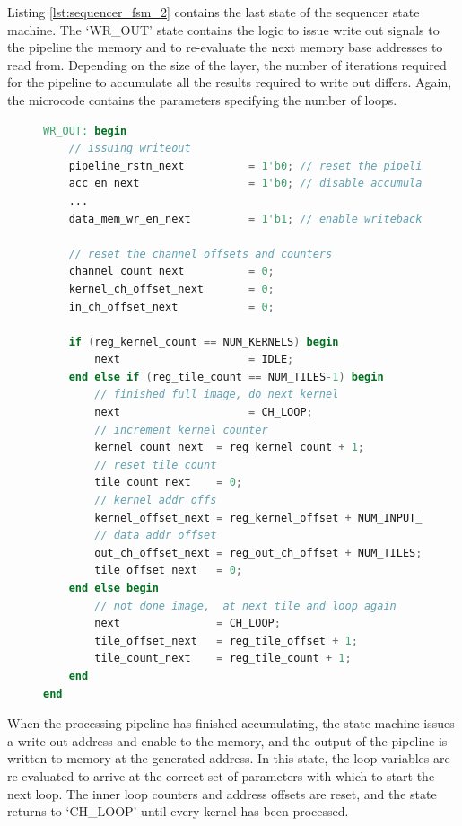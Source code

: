 \documentclass{uw-ece-wkrpt}
\begin{document}
Listing \ref{lst:sequencer_fsm_2} contains the last state of the sequencer state machine. The `WR\_OUT' state contains the logic to issue write out signals to the pipeline the memory and to re-evaluate the next memory base addresses to read from. Depending on the size of the layer, the number of iterations required for the pipeline to accumulate all the results required to write out differs. Again, the microcode contains the parameters specifying the number of loops.

\begin{figure}
\centering
\begin{lstlisting}[caption={Sequencer state machine part 2}, label=lst:sequencer_fsm_2, language=Verilog]
WR_OUT: begin
    // issuing writeout
    pipeline_rstn_next          = 1'b0; // reset the pipeline
    acc_en_next                 = 1'b0; // disable accumulation
    ...
    data_mem_wr_en_next         = 1'b1; // enable writeback memory

    // reset the channel offsets and counters
    channel_count_next          = 0;
    kernel_ch_offset_next       = 0;
    in_ch_offset_next           = 0;

    if (reg_kernel_count == NUM_KERNELS) begin
        next                    = IDLE;
    end else if (reg_tile_count == NUM_TILES-1) begin
        // finished full image, do next kernel
        next                    = CH_LOOP;
        // increment kernel counter
        kernel_count_next  = reg_kernel_count + 1;
        // reset tile count
        tile_count_next    = 0;
        // kernel addr offs
        kernel_offset_next = reg_kernel_offset + NUM_INPUT_CHANNELS;
        // data addr offset
        out_ch_offset_next = reg_out_ch_offset + NUM_TILES;
        tile_offset_next   = 0;
    end else begin
        // not done image,  at next tile and loop again
        next               = CH_LOOP;
        tile_offset_next   = reg_tile_offset + 1;
        tile_count_next    = reg_tile_count + 1;
    end
end
\end{lstlisting}
\end{figure}

When the processing pipeline has finished accumulating, the state machine issues a write out address and enable to the memory, and the output of the pipeline is written to memory at the generated address. In this state, the loop variables are re-evaluated to arrive at the correct set of parameters with which to start the next loop. The inner loop counters and address offsets are reset, and the state returns to `CH\_LOOP' until every \gls{kernel} has been processed.
\end{document}
